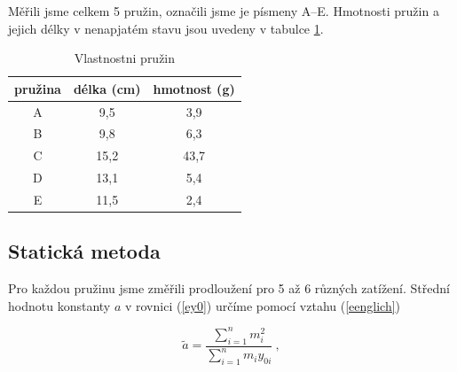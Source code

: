 \documentclass{article}
\begin{document}
Měřili jsme celkem 5 pružin, označili jsme je písmeny A--E. Hmotnosti pružin a jejich délky v nenapjatém stavu jsou uvedeny v tabulce \ref{tpruziny}.


\begin{table}[htbp]
\begin{center}

\begin{tabular}{|c|c|c|}
\hline
pružina & \multicolumn{1}{l|}{délka (cm)} & \multicolumn{1}{l|}{hmotnost (g)} \\ \hline
A & 9,5 & 3,9 \\ \hline
B & 9,8 & 6,3 \\ \hline
C & 15,2 & 43,7 \\ \hline
D & 13,1 & 5,4 \\ \hline
E & 11,5 & 2,4 \\ \hline
\end{tabular}
\caption{Vlastnostni pružin}
\label{tpruziny}

\end{center}
\end{table}

\subsection*{Statická metoda}
Pro každou pružinu jsme změřili prodloužení pro 5 až 6 různých zatížení. Střední hodnotu konstanty $a$ v rovnici (\ref{ey0}) určíme pomocí vztahu (\ref{eenglich}) \cite{englich}

\begin{equation} \label{eenglich}
\tilde a = \frac{\sum_{i=1}^{n} m_{i}^{2}}{\sum_{i=1}^{n} m_{i}y_{0i}}~,
\end{equation}
\end{document}
